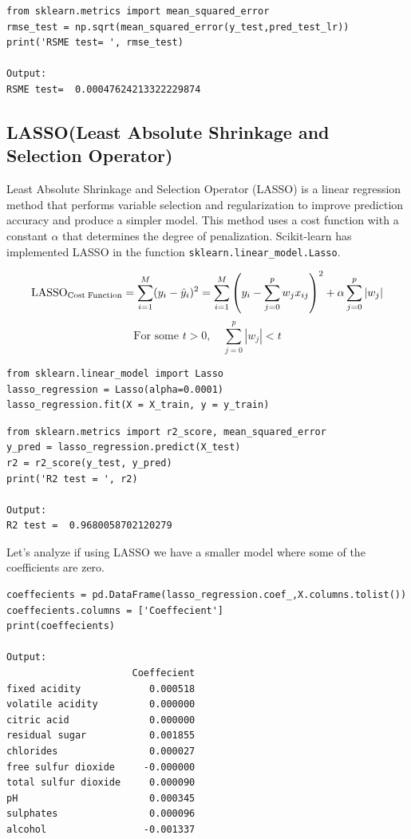 \begin{lstlisting}[style=mypython]
from sklearn.metrics import mean_squared_error
rmse_test = np.sqrt(mean_squared_error(y_test,pred_test_lr))
print('RSME test= ', rmse_test)

Output:
RSME test=  0.00047624213322229874
\end{lstlisting}

\subsection{LASSO(Least Absolute Shrinkage and Selection Operator)}
Least Absolute Shrinkage and Selection Operator (LASSO) is a linear regression method that performs variable selection and regularization to improve prediction accuracy and produce a simpler model. This method uses a cost function with a constant $\alpha$ that determines the degree of penalization. Scikit-learn has implemented LASSO in the function \texttt{sklearn.linear\_model.Lasso}.

\[
\text{LASSO}_{\text{Cost\;Function}} = \sum_{i=1}^M (y_i - \hat{y}_i)^2 = \sum_{i=1}^M \left( y_i - \sum_{j=0}^p w_j x_{ij} \right)^2 + \alpha \sum_{j=0}^p |w_j|
\]
\[
\text{For some } t > 0, \quad \sum_{j=0}^p |w_j| < t
\]
\begin{lstlisting}[style=mypython]
from sklearn.linear_model import Lasso
lasso_regression = Lasso(alpha=0.0001)
lasso_regression.fit(X = X_train, y = y_train)
\end{lstlisting}

\begin{lstlisting}[style=mypython]
from sklearn.metrics import r2_score, mean_squared_error
y_pred = lasso_regression.predict(X_test)
r2 = r2_score(y_test, y_pred)
print('R2 test = ', r2)

Output:
R2 test =  0.9680058702120279
\end{lstlisting}
Let's analyze if using LASSO we have a smaller model where some of the coefficients are zero.
\begin{lstlisting}[style=mypython]
coeffecients = pd.DataFrame(lasso_regression.coef_,X.columns.tolist())
coeffecients.columns = ['Coeffecient']
print(coeffecients)

Output:
                      Coeffecient
fixed acidity            0.000518
volatile acidity         0.000000
citric acid              0.000000
residual sugar           0.001855
chlorides                0.000027
free sulfur dioxide     -0.000000
total sulfur dioxide     0.000090
pH                       0.000345
sulphates                0.000096
alcohol                 -0.001337
\end{lstlisting}

